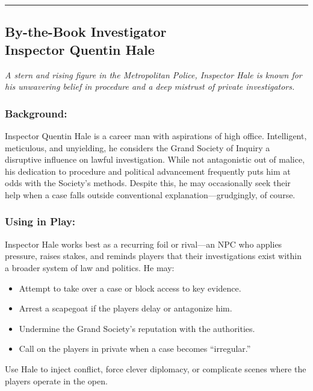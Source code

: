     \vspace{.5\baselineskip}
    \hrule
    \vspace{.5\baselineskip}

    \subsection{{\small By-the-Book Investigator}\\ Inspector Quentin Hale}
    \label{npc:inspector-hale}
    
    \emph{A stern and rising figure in the Metropolitan Police, Inspector Hale is known for his unwavering belief in procedure and a deep mistrust of private investigators.}
    \vspace{.5\baselineskip}
    
    \begin{paracol}{3}
        \subsubsection*{Background:}
        Inspector Quentin Hale is a career man with aspirations of high office. Intelligent, meticulous, and unyielding, he considers the Grand Society of Inquiry a disruptive influence on lawful investigation. While not antagonistic out of malice, his dedication to procedure and political advancement frequently puts him at odds with the Society’s methods. Despite this, he may occasionally seek their help when a case falls outside conventional explanation—grudgingly, of course.
        
        \switchcolumn
        \subsubsection*{Using in Play:}
        Inspector Hale works best as a recurring foil or rival—an NPC who applies pressure, raises stakes, and reminds players that their investigations exist within a broader system of law and politics. He may:
        \begin{itemize}
          \item Attempt to take over a case or block access to key evidence.
          \item Arrest a scapegoat if the players delay or antagonize him.
          \item Undermine the Grand Society’s reputation with the authorities.
          \item Call on the players in private when a case becomes “irregular.”
        \end{itemize}
        Use Hale to inject conflict, force clever diplomacy, or complicate scenes where the players operate in the open.
        

\end{paracol}
